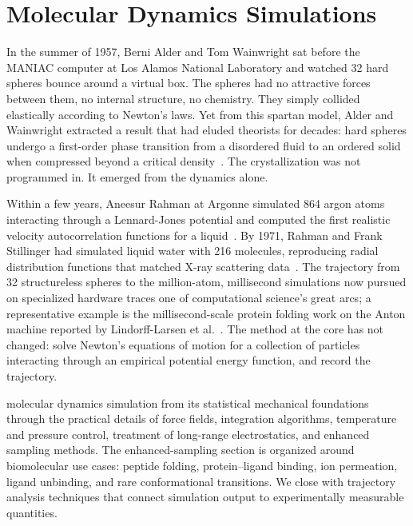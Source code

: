 \chapter{Molecular Dynamics Simulations}
\label{ch:molecular-dynamics}

In the summer of 1957, Berni Alder and Tom Wainwright sat before the MANIAC computer at Los Alamos National Laboratory and watched 32 hard spheres bounce around a virtual box. The spheres had no attractive forces between them, no internal structure, no chemistry. They simply collided elastically according to Newton's laws. Yet from this spartan model, Alder and Wainwright extracted a result that had eluded theorists for decades: hard spheres undergo a first-order phase transition from a disordered fluid to an ordered solid when compressed beyond a critical density~\cite{alder1957}. The crystallization was not programmed in. It emerged from the dynamics alone.

Within a few years, Aneesur Rahman at Argonne simulated 864 argon atoms interacting through a Lennard-Jones potential and computed the first realistic velocity autocorrelation functions for a liquid~\cite{rahman1964}. By 1971, Rahman and Frank Stillinger had simulated liquid water with 216 molecules, reproducing radial distribution functions that matched X-ray scattering data~\cite{rahman1971water}. The trajectory from 32 structureless spheres to the million-atom, millisecond simulations now pursued on specialized hardware traces one of computational science's great arcs; a representative example is the millisecond-scale protein folding work on the Anton machine reported by Lindorff-Larsen et al.~\cite{lindorff2011}. The method at the core has not changed: solve Newton's equations of motion for a collection of particles interacting through an empirical potential energy function, and record the trajectory.

 molecular dynamics simulation from its statistical mechanical foundations through the practical details of force fields, integration algorithms, temperature and pressure control, treatment of long-range electrostatics, and enhanced sampling methods. The enhanced-sampling section is organized around biomolecular use cases: peptide folding, protein--ligand binding, ion permeation, ligand unbinding, and rare conformational transitions. We close with trajectory analysis techniques that connect simulation output to experimentally measurable quantities.

